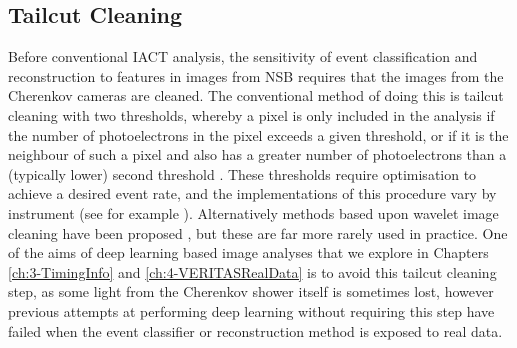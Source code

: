 \subsection{Tailcut Cleaning}

Before conventional IACT analysis, the sensitivity of event classification and reconstruction to features in images from NSB requires that the images from the Cherenkov cameras are cleaned. The conventional method of doing this is tailcut cleaning with two thresholds, whereby a pixel is only included in the analysis if the number of photoelectrons in the pixel exceeds a given threshold, or if it is the neighbour of such a pixel and also has a greater number of photoelectrons than a (typically lower) second threshold \cite{hegratailcut}. These thresholds require optimisation to achieve a desired event rate, and the implementations of this procedure vary by instrument (see for example \cite{magictailcut}\cite{Benbow}\cite{magictime}). Alternatively methods based upon wavelet image cleaning have been proposed \cite{wavelet}, but these are far more rarely used in practice. One of the aims of deep learning based image analyses that we explore in Chapters \ref{ch:3-TimingInfo} and \ref{ch:4-VERITASRealData} is to avoid this tailcut cleaning step, as some light from the Cherenkov shower itself is sometimes lost, however previous attempts at performing deep learning without requiring this step have failed when the event classifier or reconstruction method is exposed to real data. 

